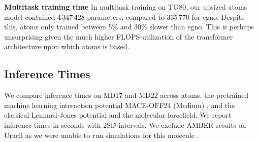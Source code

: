 \textbf{Multitask training time} In multitask training on TG80, our upsized \gls{atoms} model contained 4\,347\,428 parameters, compared to 335\,770 for \gls{egno}. Despite this, \gls{atoms} only trained between 5\% and 30\% slower than \gls{egno}. This is perhaps unsurprising given the much higher FLOPS-utilization of the transformer architecture upon which \gls{atoms} is based.

\begin{table}[H]
    \centering
    \caption{Compute cost of multitask training on the five TG80 cluster splits over 1000 epochs. Both \gls{atoms} (4\,347\,428 params) and \gls{egno} (335\,770 params) are under \texttt{torch.compile} on a Titan V. Total FLOPS is wall-clock time multiplied by the peak FP32 throughput of the GPU.}
    \label{tab:tg80_compute_cost}
\end{table}
\subsection{Inference Times}
\label{app:inference_times}
{We compare inference times on MD17 and MD22 across \gls{atoms}, the pretrained machine learning interaction potential MACE-OFF24 (Medium) \cite{kovacs_mace-off_2025}, and the classical Lennard-Jones potential \cite{larsen_atomic_2017, schwerdtfeger_100_2024} and the molecular forcefield. We report inference times in seconds with 2SD intervals. We exclude AMBER results on Uracil as we were unable to run simulations for this molecule \cite{case_ambertools_2023}.}

